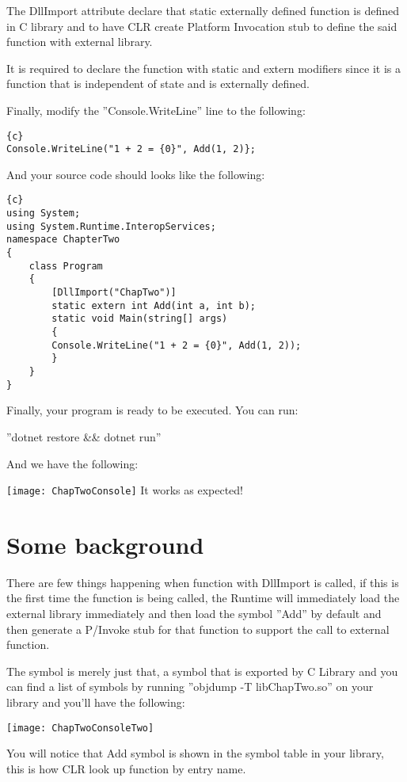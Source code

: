 The DllImport attribute declare that static externally defined function is defined in C library and to have CLR create Platform Invocation stub to define the said function with external library.

It is required to declare the function with static and extern modifiers since it is a function that is independent of state and is externally defined.

Finally, modify the ''Console.WriteLine'' line to the following:

\begin{lstlisting}{c}
Console.WriteLine("1 + 2 = {0}", Add(1, 2)};
\end{lstlisting}
And your source code should looks like the following:

\begin{lstlisting}{c}
using System;
using System.Runtime.InteropServices;
namespace ChapterTwo
{
	class Program
	{
		[DllImport("ChapTwo")]
		static extern int Add(int a, int b);
		static void Main(string[] args)
		{
		Console.WriteLine("1 + 2 = {0}", Add(1, 2));
		}
	}
}
\end{lstlisting}
\newpage
Finally, your program is ready to be executed. You can run:

''dotnet restore \&\& dotnet run''

And we have the following:

\texttt{[image: ChapTwoConsole]}
It works as expected!
\newpage
\section{Some background}
There are few things happening when function with DllImport is called, if this is the first time the function is being called, the Runtime will immediately load the external library immediately and then load the symbol ''Add'' by default and then generate a P/Invoke stub for that function to support the call to external function.

The symbol is merely just that, a symbol that is exported by C Library and you can find a list of symbols by running ''objdump -T libChapTwo.so'' on your library and you'll have the following:

\texttt{[image: ChapTwoConsoleTwo]}

You will notice that Add symbol is shown in the symbol table in your library, this is how CLR look up function by entry name.